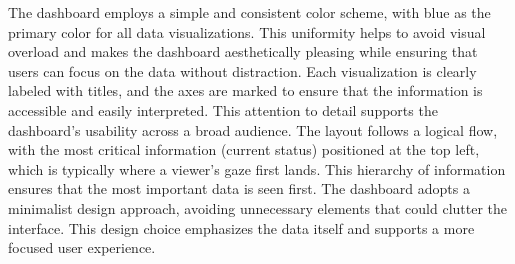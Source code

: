 \documentclass[10pt]{extarticle}
\begin{document}
The dashboard employs a simple and consistent color scheme, with blue as the primary color for all data visualizations. This uniformity helps to avoid visual overload and makes the dashboard aesthetically pleasing while ensuring that users can focus on the data without distraction. Each visualization is clearly labeled with titles, and the axes are marked to ensure that the information is accessible and easily interpreted. This attention to detail supports the dashboard's usability across a broad audience. The layout follows a logical flow, with the most critical information (current status) positioned at the top left, which is typically where a viewer's gaze first lands. This hierarchy of information ensures that the most important data is seen first. The dashboard adopts a minimalist design approach, avoiding unnecessary elements that could clutter the interface. This design choice emphasizes the data itself and supports a more focused user experience.

\newpage

\printbibliography{}

\newpage
\end{document}
